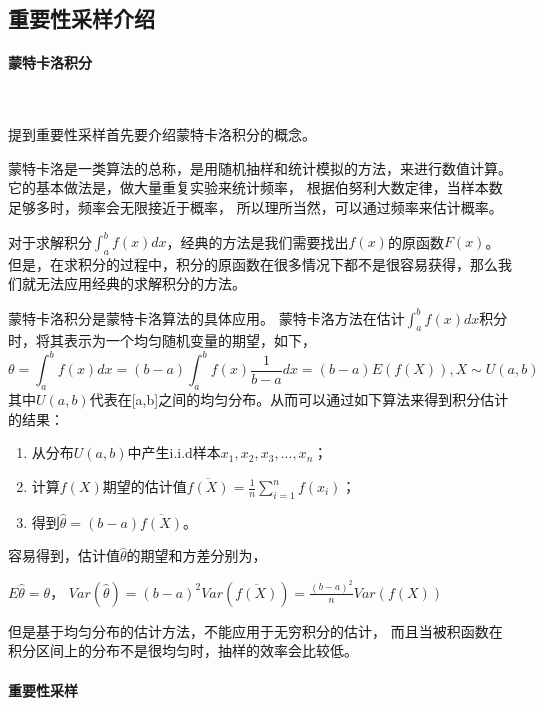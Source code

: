   \subsection{重要性采样介绍}

  \paragraph{蒙特卡洛积分}~{}

  提到重要性采样首先要介绍蒙特卡洛积分的概念。

  蒙特卡洛是一类算法的总称，是用随机抽样和统计模拟的方法，来进行数值计算。
  它的基本做法是，做大量重复实验来统计频率，
  根据伯努利大数定律，当样本数足够多时，频率会无限接近于概率，
  所以理所当然，可以通过频率来估计概率。

  对于求解积分$\int_a^b f(x)dx$，经典的方法是我们需要找出$f(x)$的原函数$F(x)$。
  但是，在求积分的过程中，积分的原函数在很多情况下都不是很容易获得，那么我们就无法应用经典的求解积分的方法。

  蒙特卡洛积分是蒙特卡洛算法的具体应用。
  蒙特卡洛方法在估计$\int_a^b f(x)dx$积分时，将其表示为一个均匀随机变量的期望，如下，
  \begin{equation}
      \theta=\int_a^b f(x)dx = (b-a)\int_a^b f(x) \frac{1}{b-a}dx=(b-a)E(f(X)), X\sim U(a,b)
  \end{equation}
  其中$U(a,b)$代表在[a,b]之间的均匀分布。从而可以通过如下算法来得到积分估计的结果：
  \begin{enumerate}
      \item 从分布$U(a,b)$中产生i.i.d样本$x_1,x_2,x_3,...,x_n$；
      \item 计算$f(X)$期望的估计值$\overline{f(X)}=\frac{1}{n}\sum_{i=1}^{n} f(x_i)$；
      \item 得到$\hat{\theta}=(b-a)\overline{f(X)}$。
  \end{enumerate}
  容易得到，估计值$\hat{\theta}$的期望和方差分别为，

  $E\hat{\theta}=\theta$，
  $Var(\hat{\theta})=(b-a)^2 Var(\overline{f(X)})=\frac{(b-a)^2}{n}Var(f(X))$

  但是基于均匀分布的估计方法，不能应用于无穷积分的估计，
  而且当被积函数在积分区间上的分布不是很均匀时，抽样的效率会比较低。

  \paragraph{重要性采样}~{}

